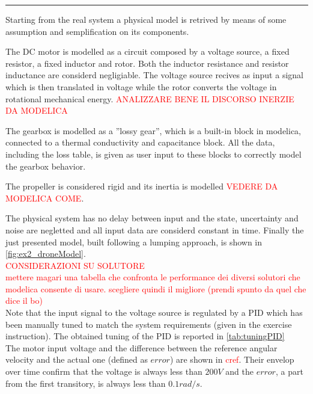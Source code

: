 \documentclass[11pt,a4paper,oneside]{article}
\newcommand{\tr}{\textcolor{red}}
\begin{document}
\medskip
\medskip \hrule \medskip
{}

Starting from the real system a physical model is retrived by means of some assumption and semplification on its components. 

The DC motor is modelled as a circuit composed by a voltage source, a fixed resistor, a fixed inductor and rotor.
Both the inductor resistance and resistor inductance are considerd negligiable.
The voltage source recives as input a signal which is then translated in voltage while the rotor converts the voltage in rotational mechanical energy.
\tr{ANALIZZARE BENE IL DISCORSO INERZIE DA MODELICA}

The gearbox is modelled as a ''lossy gear'', which is a built-in block in modelica, connected to a thermal conductivity and capacitance block.
All the data, including the loss table, is given as user input to these blocks to correctly model the gearbox behavior.

The propeller is considered rigid and its inertia is modelled \tr{VEDERE DA MODELICA COME}.

The physical system has no delay between input and the state, uncertainty and noise are negletted and all input data are considerd constant in time. 
Finally the just presented model, built following a lumping approach, is shown in \cref{fig:ex2_droneModel}.
\\

\tr{
CONSIDERAZIONI SU SOLUTORE\\
mettere magari una tabella che confronta le performance dei diversi solutori che modelica consente di usare.
scegliere quindi il migliore (prendi spunto da quel che dice il bo)
}\\

Note that the input signal to the voltage source is regulated by a PID which has been manually tuned to match the system requirements (given in the exercise instruction).
The obtained tuning of the PID is reported in \cref{tab:tuningPID}
\\

The motor input voltage and the difference between the reference angular velocity and the actual one (defined as $error$) are shown in \tr{cref}.
Their envelop over time confirm that the voltage is always less than $200V$ and the $error$, a part from the first transitory, is always less than $0.1rad/s$.
\\
\end{document}
